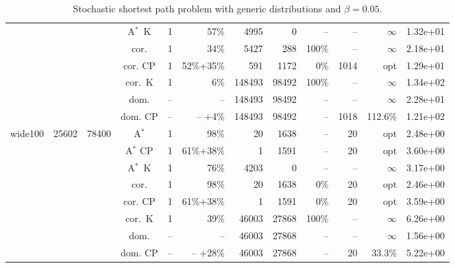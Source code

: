 \documentclass[11pt]{amsart}
\newenvironment{outdent}
{\begin{list}{}{\leftmargin-2cm\rightmargin\leftmargin}\centering\item\relax}
{\end{list}\ignorespacesafterend}
\theoremstyle{plain}
\theoremstyle{remark}
\begin{document}
\begin{table}
\begin{outdent}
\begin{small}
\begin{tabular}{|l|rrc|rr|rrr|rr|r|}
&&&A$^*$~K & 1 & 57\% &4995 & 0 & -- & -- &$\infty$ & 1.32e+01 \\
&&&cor. & 1 & 34\% &5427 & 288 & 100\% & -- &$\infty$ & 2.18e+01 \\
&&&cor. CP & 1 & 52\%+35\% &591 & 1172 & 0\% &1014 & opt & 1.29e+01 \\
&&&cor.~K & 1 & 6\% &148493 & 98492 & 100\% & -- &$\infty$ & 1.34e+02 \\
&&&dom. & -- & --  &148493 & 98492 & -- & -- &$\infty$ & 2.28e+01 \\
&&&dom. CP & -- & -- +4\% &148493 & 98492 & -- &1018 & 112.6\% & 1.21e+02 \\
\hline
wide100 & 25602 & 78400 & A$^*$ & 1 & 98\% &20 & 1638 & -- &20 & opt & 2.48e+00 \\
&&&A$^*$ CP & 1 & 61\%+38\% &1 & 1591 & -- &20 & opt & 3.60e+00 \\
&&&A$^*$~K & 1 & 76\% &4203 & 0 & -- & -- &$\infty$ & 3.17e+00 \\
&&&cor. & 1 & 98\% &20 & 1638 & 0\% &20 & opt & 2.46e+00 \\
&&&cor. CP & 1 & 61\%+38\% &1 & 1591 & 0\% &20 & opt & 3.59e+00 \\
&&&cor.~K & 1 & 39\% &46003 & 27868 & 100\% & -- &$\infty$ & 6.26e+00 \\
&&&dom. & -- & --  &46003 & 27868 & -- & -- &$\infty$ & 1.56e+00 \\
&&&dom. CP & -- & -- +28\% &46003 & 27868 & -- &20 & 33.3\% & 5.22e+00 \\
\hline
\end{tabular}
\end{small}
\end{outdent}
\caption{Stochastic shortest path problem with generic distributions and $\beta = 0.05$.}
\label{tab:dctDist}
\end{table}
\end{document}

